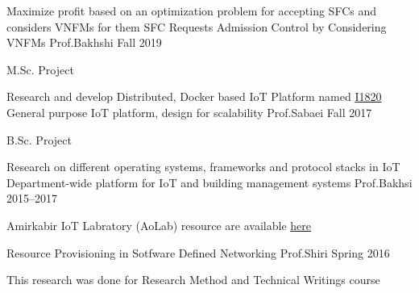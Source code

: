 

\begin{cventries}

  \cventry
    {Maximize profit based on an optimization problem for accepting SFCs and considers VNFMs for them} %
    {SFC Requests Admission Control by Considering VNFMs} %
    {Prof.Bakhshi} %
    {Fall 2019} %
    {
      \begin{cvitems} %
        \item {M.Sc. Project}
      \end{cvitems}
    }

  \cventry
    {Research and develop Distributed, Docker based IoT Platform named \href{https://github.com/I1820}{I1820}} %
    {General purpose IoT platform, design for scalability} %
    {Prof.Sabaei} %
    {Fall 2017} %
    {
      \begin{cvitems} %
        \item {B.Sc. Project}
      \end{cvitems}
    }

  \cventry
    {Research on different operating systems, frameworks and protocol stacks in IoT} %
    {Department-wide platform for IoT and building management systems} %
    {Prof.Bakhsi} %
    {2015--2017} %
    {
      \begin{cvitems} %
        \item {Amirkabir IoT Labratory (AoLab) resource are available \href{https://aolab.github.io/}{here}}
      \end{cvitems}
    }

  \cventry
    {} %
    {Resource Provisioning in Sotfware Defined Networking} %
    {Prof.Shiri} %
    {Spring 2016} %
    {
      \begin{cvitems} %
        \item {This research was done for Research Method and Technical Writings course}
      \end{cvitems}
    }

\end{cventries}
